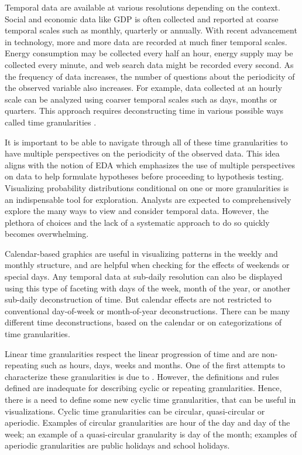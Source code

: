 \documentclass[12pt]{article}
\begin{document}
Temporal data are available at various resolutions depending on the context. Social and economic data like GDP is often collected and reported at coarse temporal scales such as monthly, quarterly or annually. With recent advancement in technology, more and more data are recorded at much finer temporal scales. Energy consumption may be collected every half an hour, energy supply may be collected every minute, and web search data might be recorded every second. As the frequency of data increases, the number of questions about the periodicity of the observed variable also increases. For example, data collected at an hourly scale can be analyzed using coarser temporal scales such as days, months or quarters. This approach requires deconstructing time in various possible ways called time granularities \citep{aigner2011visualization}.

It is important to be able to navigate through all of these time granularities to have multiple perspectives on the periodicity of the observed data. This idea aligns with the notion of EDA \citep{Tukey1977-jx} which emphasizes the use of multiple perspectives on data to help formulate hypotheses before proceeding to hypothesis testing. Visualizing probability distributions conditional on one or more granularities is an indispensable tool for exploration. Analysts are expected to comprehensively explore the many ways to view and consider temporal data. However, the plethora of choices and the lack of a systematic approach to do so quickly becomes overwhelming.

Calendar-based graphics \citep{wang2020calendar} are useful in visualizing patterns in the weekly and monthly structure, and are helpful when checking for the effects of weekends or special days. Any temporal data at sub-daily resolution can also be displayed using this type of faceting \citep{Wickham2009pk} with days of the week, month of the year, or another sub-daily deconstruction of time. But calendar effects are not restricted to conventional day-of-week or month-of-year deconstructions. There can be many different time deconstructions, based on the calendar or on categorizations of time granularities.

Linear time granularities respect the linear progression of time and are non-repeating such as hours, days, weeks and months. One of the first attempts to characterize these granularities is due to \citet{Bettini1998-ed}. However, the definitions and rules defined are inadequate for describing cyclic or repeating granularities. Hence, there is a need to define some new cyclic time granularities, that can be useful in visualizations. Cyclic time granularities can be circular, quasi-circular or aperiodic. Examples of circular granularities are hour of the day and day of the week; an example of a quasi-circular granularity is day of the month; examples of aperiodic granularities are public holidays and school holidays.
\end{document}

